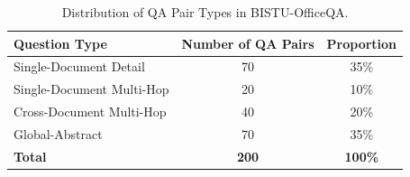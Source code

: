 \begin{table}[!htbp]
\centering
\begin{tabular}{lcc}
\toprule
\textbf{Question Type} & \textbf{Number of QA Pairs} & \textbf{Proportion} \\
\midrule
Single-Document Detail        & 70  & 35\% \\
Single-Document Multi-Hop     & 20  & 10\% \\
Cross-Document Multi-Hop      & 40  & 20\% \\
Global-Abstract               & 70  & 35\% \\
\midrule
\textbf{Total}                & \textbf{200} & \textbf{100\%} \\
\bottomrule
\end{tabular}
\caption{Distribution of QA Pair Types in BISTU-OfficeQA.}
\label{tab:qa-distribution}
\end{table}